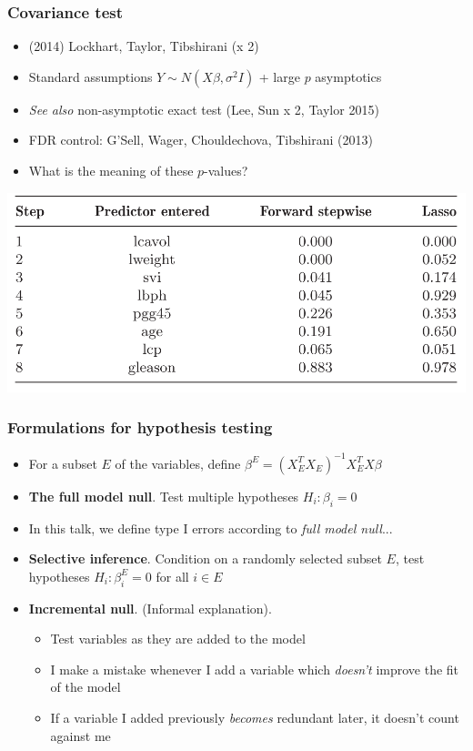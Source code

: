 \documentclass{beamer}
\begin{document}
\begin{frame}
\frametitle{Covariance test}
\begin{itemize}
\item (2014) Lockhart, Taylor, Tibshirani (x 2)
\item Standard assumptions $Y \sim N(X\beta, \sigma^2 I)$ + large $p$ asymptotics
\item \emph{See also} non-asymptotic exact test (Lee, Sun x 2, Taylor 2015)
\item FDR control: G'Sell, Wager, Chouldechova, Tibshirani (2013)
\item What is the meaning of these $p$-values?
\end{itemize}
\begin{center}
\includegraphics[scale = 0.25]{covtest.png}
\end{center}
\end{frame}

\begin{frame}
\frametitle{Formulations for hypothesis testing}
\begin{itemize}
\item<1-5> For a subset $E$ of the variables, define $\beta^E = (X_E^T X_E)^{-1} X_E^T X\beta$
\item<2-> \textbf{The full model null}.  Test multiple hypotheses $H_i: \beta_i = 0$
\item<5> In this talk, we define type I errors according to \emph{full model
  null}... 
\item<3> \textbf{Selective inference}.  Condition on a randomly selected subset $E$, test hypotheses $H_i: \beta^E_i = 0$ for all $i \in E$
\item<4> \textbf{Incremental null}.  (Informal explanation).
\begin{itemize}
\item Test variables as they are added to the model
\item I make a mistake whenever I add a variable which \emph{doesn't} improve the fit of the model
\item If a variable I added previously \emph{becomes} redundant later, it doesn't count against me
\end{itemize}
\end{itemize}
\end{frame}
\end{document}
